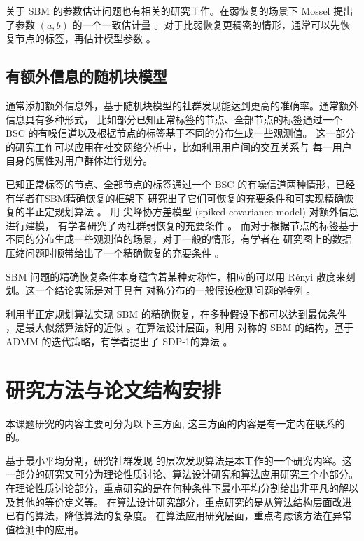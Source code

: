 关于 SBM 的参数估计问题也有相关的研究工作。在弱恢复的场景下 Mossel 提出了参数 $(a,b)$ 的一个一致估计量
\cite{mossel2015reconstruction}。对于比弱恢复更稠密的情形，通常可以先恢复节点的标签，再估计模型参数
\cite{abbe2015recovering}。

\subsection{有额外信息的随机块模型}
通常添加额外信息外，基于随机块模型的社群发现能达到更高的准确率。通常额外信息具有多种形式，
比如部分已知正常标签的节点、全部节点的标签通过一个 BSC 的有噪信道以及根据节点的标签基于不同的分布生成一些观测值\cite{saad2018community}。
这一部分的研究工作可以应用在社交网络分析中，比如利用用户间的交互关系与
每一用户自身的属性对用户群体进行划分。

已知正常标签的节点、全部节点的标签通过一个 BSC 的有噪信道两种情形，已经有学者在SBM精确恢复的框架下
研究出了它们可恢复的充要条件和可实现精确恢复的半正定规划算法 \cite{esmaeili2019community, esmaeili2019exact}。
用 尖峰协方差模型 (spiked covariance model) 对额外信息
进行建模，
有学者研究了两社群弱恢复的充要条件 \cite{deshpande2018contextual}。
而对于根据节点的标签基于不同的分布生成一些观测值的场景，对于一般的情形，有学者在
研究图上的数据压缩问题时顺带给出了一个精确恢复的充要条件 \cite{abbe17sideinfo}。

SBM 问题的精确恢复条件本身蕴含着某种对称性，相应的可以用 Rényi 散度来刻划。这一个结论实际是对于具有
对称分布的一般假设检测问题的特例 \cite{gao2018community}。

利用半正定规划算法实现 SBM 的精确恢复，在多种假设下都可以达到最优条件 \cite{hajek2016achieving}，是最大似然算法好的近似 。在算法设计层面，利用 对称的 SBM 的结构，基于 ADMM 的迭代策略，有学者提出了 SDP-1的算法 \cite{amini2018semidefinite}。

\section{研究方法与论文结构安排}
本课题研究的内容主要可分为以下三方面, 这三方面的内容是有一定内在联系的
的。

基于最小平均分割，研究社群发现
的层次发现算法是本工作的一个研究内容。这一部分的研究又可分为理论性质讨论、算法设计研究和算法应用研究三个小部分。
在理论性质讨论部分，重点研究的是在何种条件下最小平均分割给出非平凡的解以及其他的等价定义等。
在算法设计研究部分，重点研究的是从算法结构层面改进已有的算法，降低算法的复杂度。
在算法应用研究层面，重点考虑该方法在异常值检测中的应用。

